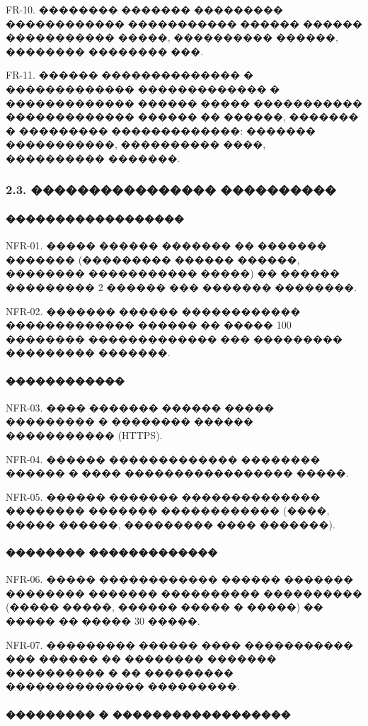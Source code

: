 \documentclass{G7-32}
\begin{document}
FR-10. �������� ������� ��������� ������������  
����������� ������ ������ ����������� �����, ���������� ������, �������� �������� ���.

FR-11. ������ �������������� � �������������  
������������� � ������������� ������ ����� ����������� ������������� ������ �� ������, ������� � ��������� �������������: ������� �����������, ���������� ����, ���������� �������.

\subsubsection*{2.3. ���������������� ����������}

\paragraph{������������������}

NFR-01. ����� ������ ������� �� ������� ������� (��������� ������ ������, �������� ����������� �����) �� ������ ��������� 2 ������ ��� ������� ��������.  

NFR-02. ������� ������ ������������ ������������� ������ �� ����� 100 �������� ������������� ��� ��������� ��������� �������.

\paragraph{������������}

NFR-03. ���� ������� ������ ����� ��������� � �������� ������ ����������� (HTTPS).  

NFR-04. ������ ������������� �������� ������ � ���� ����������������� �����.  

NFR-05. ������ ������� �������������� �������� ������� ������������ (����, ����� ������, ��������� ���� �������).

\paragraph{�������� �������������}

NFR-06. ����� ������������ ������ ������� �������� ������� ���������� ���������� (����� �����, ������ ����� � �����) �� ����� �� ����� 30 �����.  

NFR-07. ��������� ������ ���� ����������� ��� ������ �� �������� ������� ���������� � �� ��������� �������������� ���������.

\paragraph{��������� � ������������������}
\end{document}
